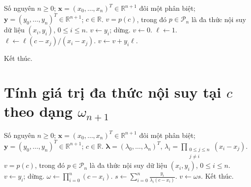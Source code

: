 \documentclass[12pt,a4paper,oneside]{book}
\numberwithin{algorithm}{chapter}
\theoremstyle{definition}
\newcommand{\R}{\mathbb{R}}
\begin{document}
\begin{algorithm}[H]
\caption{Tính giá trị đa thức nội suy tại $c$ bằng công thức Lagrange -- chi tiết}
\label{alg:lagrange-evaluate}
\begin{algorithmic}[1]
\Require Số nguyên $n\geq0$; $\boldsymbol x=(x_0,\ldots,x_n)^T\in\R^{n+1}$ đôi một phân biệt; $\boldsymbol y=(y_0,\ldots,y_n)^T\in\R^{n+1}$; $c\in\R$.
\Ensure $v=p(c)$, trong đó $p\in\mathcal P_n$ là đa thức nội suy dữ liệu $(x_i,y_i)$, $0\leq i\leq n$.
    \State $v\gets y_i$; dừng.
  \EndIf
\EndFor
\Statex
\State $v\gets0$.
  \State $\ell\gets1$.
      \State $\ell\gets\ell(c-x_j)/(x_i-x_j)$.
    \EndIf
  \EndFor
\Statex
  \State $v\gets v+y_i\ell$.
\EndFor
\Statex

\State Kết thúc.
\end{algorithmic}
\end{algorithm}

\section{Tính giá trị đa thức nội suy tại \texorpdfstring{$c$}{c} theo dạng \texorpdfstring{$\omega_{n+1}$}{omega}}
\begin{algorithm}[H]
\caption{Tính giá trị đa thức nội suy tại $c$ theo dạng $\omega_{n+1}$ -- sơ lược}
\label{alg:lagrange-omega-evaluate-short}
\begin{algorithmic}[1]
\Require Số nguyên $n\geq0$; $\boldsymbol x=(x_0,\ldots,x_n)^T\in\R^{n+1}$ đôi một phân biệt; $\boldsymbol y=(y_0,\ldots,y_n)^T\in\R^{n+1}$; $c\in\R$. $\boldsymbol\lambda=(\lambda_0,\ldots,\lambda_n)^T$, $\lambda_i=\prod_{\substack{0\leq j\leq n\\j\ne i}}(x_i-x_j)$.
\Ensure $v=p(c)$, trong đó $p\in\mathcal P_n$ là đa thức nội suy dữ liệu $(x_i,y_i)$, $0\leq i\leq n$.
  \State $v\gets y_i$; dừng.
\EndIf
\Statex
\State $\displaystyle\omega\gets\prod_{i=0}^{n}(c-x_i)$.
\State $\displaystyle s\gets\sum_{i=0}^{n}\frac{y_i}{\lambda_i(c-x_i)}$.
\State $v\gets\omega s$.
\State Kết thúc.
\end{algorithmic}
\end{algorithm}
\end{document}
